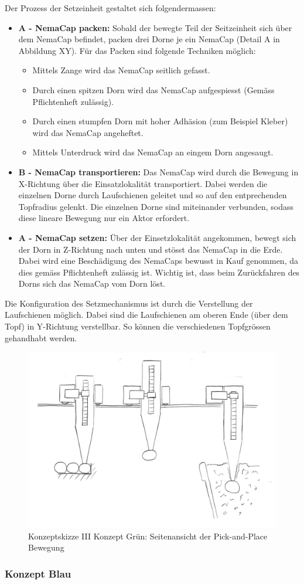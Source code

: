 Der Prozess der Setzeinheit gestaltet sich folgendermassen:
\begin{itemize}
	\item \textbf{A - NemaCap packen:} Sobald der bewegte Teil der Seitzeinheit sich über dem NemaCap befindet, packen drei Dorne je ein NemaCap (Detail A in Abbildung XY). Für das Packen sind folgende Techniken möglich:
	\begin{itemize}
		\item Mittels Zange wird das NemaCap seitlich gefasst.
		\item Durch einen spitzen Dorn wird das NemaCap aufgespiesst (Gemäss Pflichtenheft zulässig).
		\item Durch einen stumpfen Dorn mit hoher Adhäsion (zum Beispiel Kleber) wird das NemaCap angeheftet.
		\item Mittels Unterdruck wird das NemaCap an eingem Dorn angesaugt.
	\end{itemize} 
	\item \textbf{B - NemaCap transportieren:} Das NemaCap wird durch die Bewegung in X-Richtung über die Einsatzlokalität transportiert. Dabei werden die einzelnen Dorne durch Laufschienen geleitet und so auf den entprechenden Topfradius gelenkt. Die einzelnen Dorne sind miteinander verbunden, sodass diese lineare Bewegung nur ein Aktor erfordert.
	\item \textbf{A - NemaCap setzen:} 
	Über der Einsetzlokalität angekommen, bewegt sich der Dorn in Z-Richtung nach unten und stösst das NemaCap in die Erde. Dabei wird eine Beschädigung des NemaCaps bewusst in Kauf genommen, da dies gemäss Pflichtenheft zulässig ist. Wichtig ist, dass beim Zurückfahren des Dorns sich das NemaCap vom Dorn löst.
\end{itemize}
Die Konfiguration des Setzmechanismus ist durch die Verstellung der Laufschienen möglich. Dabei sind die Laufschienen am oberen Ende (über dem Topf) in Y-Richtung verstellbar. So können die verschiedenen Topfgrössen gehandhabt werden.

\begin{figure}[H]
	\includegraphics[scale=0.6]{Illustrationen/5-Konzept/green_2Dmachine_seite.jpg}
	\caption{Konzeptskizze III Konzept Grün: Seitenansicht der Pick-and-Place Bewegung}
	\label{fig:transport_green_side}
\end{figure}
\subsubsection{Konzept Blau}